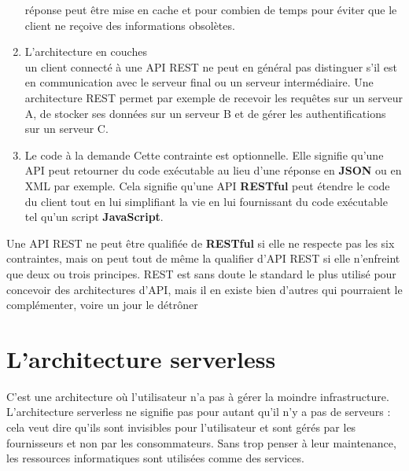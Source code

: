 \begin{enumerate}
réponse peut être mise en cache et pour combien de temps pour éviter que le client ne reçoive
des informations obsolètes.
        \item L’architecture en couches\\
un client connecté à une API REST ne peut en général pas distinguer
s’il est en communication avec le serveur final ou un serveur intermédiaire. Une architecture
REST permet par exemple de recevoir les requêtes sur un serveur A, de stocker ses données sur
un serveur B et de gérer les authentifications sur un serveur C.
        \item Le code à la demande
Cette contrainte est optionnelle. Elle signifie qu’une API peut retourner
du code exécutable au lieu d’une réponse en \textbf{JSON} ou en XML par exemple. Cela signifie qu’une
API \textbf{RESTful} peut étendre le code du client tout en lui simplifiant la vie en lui fournissant du
code exécutable tel qu’un script \textbf{JavaScript}.

\end{enumerate}

Une API REST ne peut être qualifiée de \textbf{RESTful} si elle ne respecte pas les six contraintes, mais on peut
tout de même la qualifier d’API REST si elle n’enfreint que deux ou trois principes. REST est sans doute le
standard le plus utilisé pour concevoir des architectures d’API, mais il en existe bien d’autres qui pourraient le complémenter, voire un jour le détrôner

\section{L’architecture serverless}
C’est une architecture où l’utilisateur n’a pas à gérer la moindre infrastructure. L’architecture serverless ne signifie pas pour autant qu’il n’y a pas de serveurs : cela veut dire qu’ils sont invisibles pour l’utilisateur et sont gérés par les fournisseurs et non par les consommateurs. Sans trop penser à leur maintenance, les ressources informatiques sont utilisées comme des services.
 
